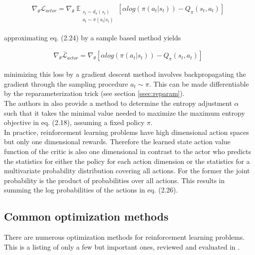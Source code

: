 \begin{align}
\nabla_\theta \mathcal{L}_{actor} = \nabla_\theta \mathop{\mathbb{E}}_{\substack{s_t \sim d_\pi(s_t) \\ a_t \sim \pi(a_t|s_t)}} \left[ \alpha log(\pi(a_t|s_t)) - Q_\pi(s_t, a_t) \right]
\end{align}

approximating eq. (2.24) by a sample based method yields

\begin{align}
\nabla_\theta \bar{\mathcal{L}}_{actor} = \nabla_\theta \left[ \alpha log(\pi(a_t|s_t)) - Q_\pi(s_t, a_t) \right]
\end{align}

minimizing this loss by a gradient descent method involves backpropagating the gradient through the sampling procedure $a_t \sim \pi$. This can be made differentiable by the reparameterization trick (see section \ref{ssec:reparam}).\\
The authors in \cite{haarnoja2018soft} also provide a method to determine the entropy adjustment $\alpha$ such that it takes the minimal value needed to maximize the maximum entropy objective in eq. (2.18), assuming a fixed policy $\pi$.\\
In practice, reinforcement learning problems have high dimensional action spaces but only one dimensional rewards. Therefore the learned state action value function of the critic is also one dimensional in contrast to the actor who predicts the statistics for either the policy for each action dimension or the statistics for a multivariate probability distribution covering all actions. For the former the joint probability is the product of probabilities over all actions. This results in summing the log probabilities of the actions in eq. (2.26).

\subsection{Common optimization methods}\label{ssec:common_opt}
There are numerous optimization methods for reinforcement learning problems. This is a listing of only a few but important ones, reviewed and evaluated in \cite{hessel2017rainbow}.

